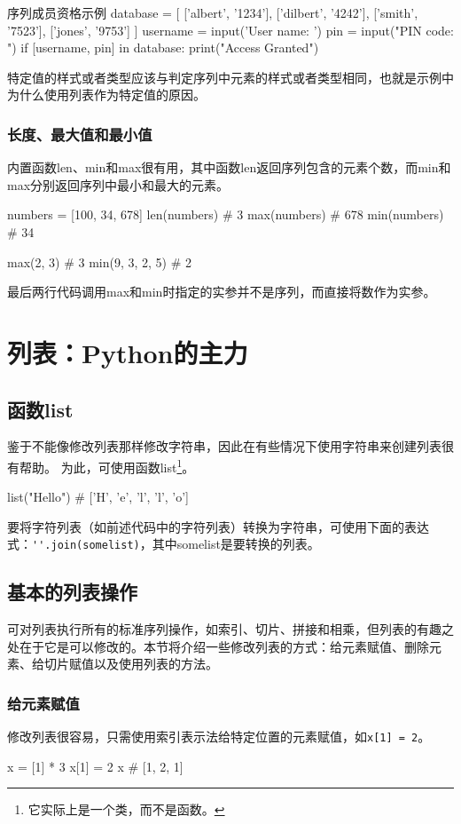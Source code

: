 \begin{py}{序列成员资格示例}
database = [
    ['albert', '1234'],
    ['dilbert', '4242'],
    ['smith', '7523'],
    ['jones', '9753']
]
username = input('User name: ')
pin = input("PIN code: ")
if [username, pin] in database:
    print("Access Granted")
\end{py}

特定值的样式或者类型应该与判定序列中元素的样式或者类型相同，也就是示例中为什么使用列表作为特定值的原因。

\subsubsection{长度、最大值和最小值}
内置函数len、min和max很有用，其中函数len返回序列包含的元素个数，而min和max分别返回序列中最小和最大的元素。
\begin{pyc}
numbers = [100, 34, 678]
len(numbers)  # 3
max(numbers)  # 678
min(numbers)  # 34

max(2, 3)  # 3
min(9, 3, 2, 5)  # 2
\end{pyc}
最后两行代码调用max和min时指定的实参并不是序列，而直接将数作为实参。

\section{列表：Python的主力}
\subsection{函数list}
鉴于不能像修改列表那样修改字符串，因此在有些情况下使用字符串来创建列表很有帮助。 为此，可使用函数list\footnote{它实际上是一个类，而不是函数。}。
\begin{pyc}
list("Hello")  # ['H', 'e', 'l', 'l', 'o']
\end{pyc}

要将字符列表（如前述代码中的字符列表）转换为字符串，可使用下面的表达式：\verb|''.join(somelist)|，其中somelist是要转换的列表。
\subsection{基本的列表操作}
可对列表执行所有的标准序列操作，如索引、切片、拼接和相乘，但列表的有趣之处在于它是可以修改的。本节将介绍一些修改列表的方式：给元素赋值、删除元素、给切片赋值以及使用列表的方法。
\subsubsection{给元素赋值}
修改列表很容易，只需使用索引表示法给特定位置的元素赋值，如\verb|x[1] = 2|。
\begin{pyc}
x = [1] * 3
x[1] = 2
x  # [1, 2, 1]
\end{pyc}


